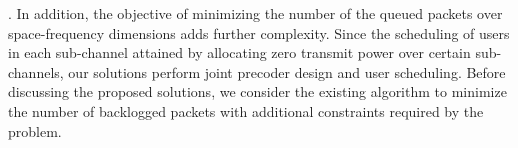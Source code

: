 . In addition, the objective of minimizing the number of the queued packets over space-frequency dimensions adds further complexity. Since the scheduling of users in each sub-channel attained by allocating zero transmit power over certain sub-channels, our solutions perform joint precoder design and user scheduling. Before discussing the proposed solutions, we consider the existing algorithm to minimize the number of backlogged packets with additional constraints required by the problem.